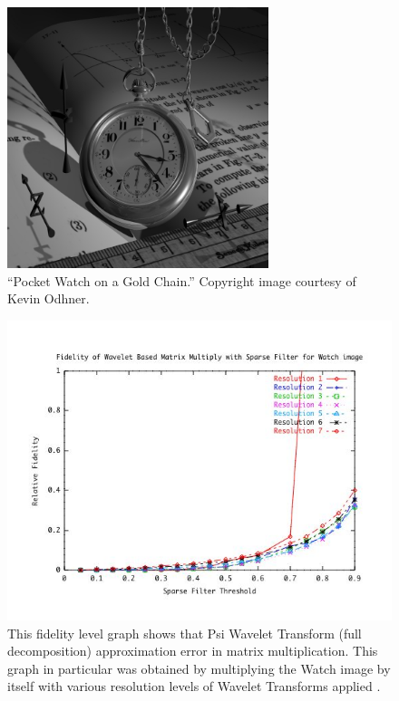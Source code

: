 \begin{figure}[ht]
\begin{center}\includegraphics [width=3in]{watch.jpg}\end{center}
\caption{``Pocket Watch on a Gold Chain.'' Copyright image courtesy of Kevin Odhner\cite{watch}.}
\label{imagewatch}
\end{figure}

\begin{figure}[ht]
\begin{center}\includegraphics [width=5in]{watchResultsB.jpg}\end{center}
\caption{This fidelity level graph shows that Psi Wavelet Transform (full decomposition) approximation error in matrix multiplication.  This graph in particular was obtained by multiplying the Watch image by itself with various resolution levels of Wavelet Transforms applied \cite{watch}.  }
\label{imagewatchFidelity}
\end{figure}

